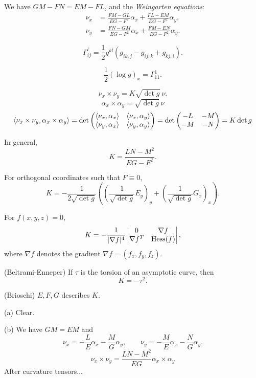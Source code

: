 \documentclass{../../large}
\renewcommand{\a}{\alpha}
\begin{document}
\begin{cor}
We have $GM-FN=EM-FL$, and the \emph{Weingarten equations}:
\begin{align*}
\nu_x&=\frac{FM-GL}{EG-F^2}\a_x+\frac{FL-EM}{EG-F^2}\a_y,\\
\nu_y&=\frac{FN-GM}{EG-F^2}\a_x+\frac{FM-EN}{EG-F^2}\a_y.
\end{align*}
\end{cor}



\begin{thm}
\[\Gamma_{ij}^l=\frac12g^{kl}(g_{ik,j}-g_{ij,k}+g_{kj,i}).\]
\end{thm}

\[\frac12(\log g)_x=\Gamma_{11}^1.\]

\[\nu_x\times\nu_y=K\sqrt{\det g}\ \nu.\]
\[\a_x\times\a_y=\sqrt{\det g}\ \nu\]
\[\<\nu_x\times\nu_y,\a_x\times\a_y\>=\det\mat{\<\nu_x,\a_x\>&\<\nu_x,\a_y\>\\\<\nu_y,\a_x\>&\<\nu_y,\a_y\>}=\det\mat{-L&-M\\-M&-N}=K\det g\]











\begin{prb}
\begin{parts}
\item
In general,
\[K=\frac{LN-M^2}{EG-F^2}.\]
\item
For orthogonal coordinates such that $F\equiv0$,
\[K=-\frac1{2\sqrt{\det g}}\left((\frac1{\sqrt{\det g}}E_y)_y+(\frac1{\sqrt{\det g}}G_x)_x\right).\]
\item
For $f(x,y,z)=0$,
\[K=-\frac1{|\nabla f|^4}\mat[v]{0&\nabla f\\\nabla f^T&\Hess(f)},\]
where $\nabla f$ denotes the gradient $\nabla f=(f_x,f_y,f_z)$.
\item(Beltrami-Enneper) If $\tau$ is the torsion of an asymptotic curve, then
\[K=-\tau^2.\]
\item(Brioschi) $E,F,G$ describes $K$.
\end{parts}
\end{prb}

\begin{pf}
(a) Clear.

(b)
We have $GM=EM$ and
\[\nu_x=-\frac LE\a_x-\frac MG\a_y,\qquad\nu_y=-\frac ME\a_x-\frac NG\a_y.\]
\[\nu_x\times\nu_y=\frac{LN-M^2}{EG}\a_x\times\a_y\]
After curvature tensors...

\end{pf}
\end{document}
